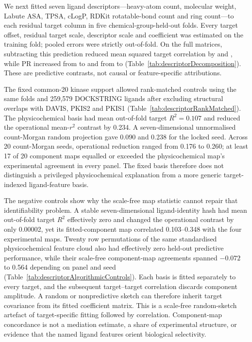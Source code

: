 \documentclass[11pt]{article}
\begin{document}
We next fitted seven ligand descriptors---heavy-atom count, molecular weight, Labute ASA,
TPSA, cLogP, RDKit rotatable-bond count and ring count---to each residual target column in
five chemical-group-held-out folds. Every target offset, residual target scale, descriptor
scale and coefficient was estimated on the training fold; pooled errors were strictly
out-of-fold. On the full matrices, subtracting this prediction reduced mean squared target
correlation by \DffDescriptorCorrelationReduction{} and
\DsDescriptorCorrelationReduction{}, while PR increased from \DffDescriptorPRBefore{} to
\DffDescriptorPRAfter{} and from \DsDescriptorPRBefore{} to
\DsDescriptorPRAfter{} (Table~\ref{tab:descriptorDecomposition}). These are predictive
contrasts, not causal or feature-specific attributions.

The fixed common-20 kinase support allowed rank-matched controls using the same folds and
259,579 DOCKSTRING ligands after excluding structural overlaps with DAVIS, PKIS2 and PKIS1
(Table~\ref{tab:descriptorRankMatched}). The
physicochemical basis had mean out-of-fold target $R^2=0.107$ and reduced the operational
mean-$r^2$ contrast by 0.234. A seven-dimensional unnormalised count-Morgan random projection
gave 0.090 and 0.238 for the locked seed. Across 20 count-Morgan seeds, operational reduction
ranged from 0.176 to 0.260; at least 17 of 20 component maps equalled or exceeded the
physicochemical map's experimental agreement in every panel. The fixed basis therefore does
not distinguish a privileged physicochemical explanation from a more generic
target-indexed ligand-feature basis.

The negative controls show why the scale-free map statistic cannot repair that
identifiability problem. A stable seven-dimensional ligand-identity hash had mean
out-of-fold target $R^2$ effectively zero and changed the operational contrast by only
0.00002, yet its fitted-component map correlated 0.103--0.348 with the four experimental
maps. Twenty row permutations of the same standardised physicochemical feature cloud also
had effectively zero held-out predictive performance, while their scale-free component-map agreements
spanned $-0.072$ to 0.564 depending on panel and seed
(Table~\ref{tab:descriptorAlgorithmicControls}). Each basis is fitted separately to every
target, and the subsequent target--target correlation discards component amplitude. A
random or nonpredictive sketch can therefore inherit target covariance from its fitted
coefficient matrix. This is a scale-free random-sketch artefact of target-specific fitting
followed by correlation. Component-map concordance is not a mediation estimate, a share of
experimental structure, or evidence that the named ligand features orient biological
selectivity.
\end{document}
